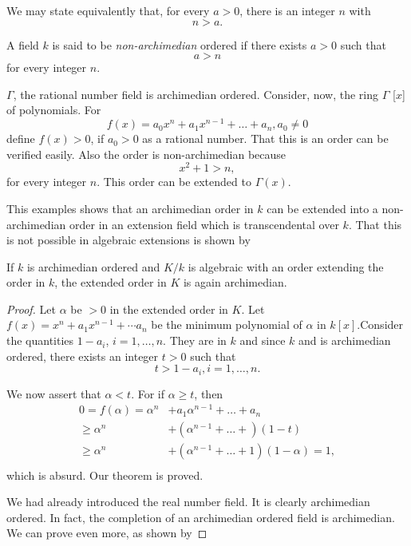 We may state equivalently that, for every $a > 0$, there is an
integer $n$ with  
$$
n > a .
$$

A field $k$ is said to be  \textit{non-archimedian} ordered if  there
exists  $ a > 0 $ such that  
$$
a > n 
$$
for every integer $n$.

$\Gamma$, the rational number field is archimedian
ordered. Consider, now, the ring $ \Gamma $ [$ x $] of
polynomials. For  
$$
f (x) = a_0 x^n + a_1 x^{n-1} + \dots + a_n ,   a_0 \neq  0 
$$
define  $f(x)>0$, if  $a_0 >0$ as a rational number. That this
is an order can be verified easily. Also the order is non-archimedian
because  
$$
x^2 + 1 > n ,
$$
for every integer $n$. This order can be extended to $ \Gamma(x)$.  

This examples shows that an archimedian order in $k$ can be extended
into a non-archimedian order in an extension field which is
transcendental over $k$. That this is not possible in algebraic
extensions is shown by  

\begin{thm}%
 If $k$  is  archimedian ordered and  $ K/k $  is algebraic with
  an order extending the order in $k$, the extended order in $K$ is
  again archimedian. 
\end{thm}

\begin{proof}
Let $ \alpha $ be  $ > 0 $ in the extended order in $K$. Let  
$ f (x) = x^n + a_1 x^{n-1} + \cdots a_n  $ be the minimum polynomial
of $ \alpha $ in  $k [x]$.\pageoriginale Consider the quantities $ 1-
a_i $, $ i = 1, \ldots , n $. They are in $k$ and since $k$ and is
archimedian ordered, there exists an integer  $ t > 0 $ such that   
$$
t > 1 - a_i,   i = 1, \ldots , n . 
$$

We now assert that $ \alpha  < t $. For if $ \alpha \ge t $, then 
\begin{align*}
0 = f (\alpha)  = \alpha^n &+  a_1 \alpha^{n-1} + \ldots + a_n \\
\ge  \alpha^n &+  ( \alpha^{n-1} + \ldots + ) ( 1-t ) \\
\ge \alpha^n  &+ ( \alpha^{n-1} + \ldots  + 1 ) ( 1 - \alpha ) = 1
,\\  
\end{align*}
which is absurd. Our theorem is proved.

We had already introduced the real number field. It is clearly
archimedian ordered. In fact, the completion of an archimedian ordered
field is archimedian. We can prove even more, as shown by  
\end{proof}

